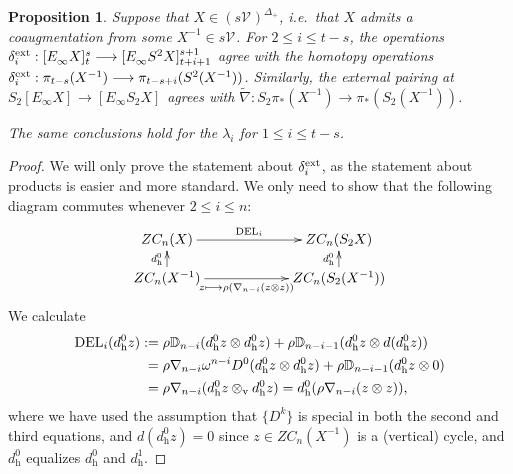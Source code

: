 \documentclass[11pt]{amsart} \renewcommand{\baselinestretch}{1.2}
\theoremstyle{plain}
\newtheorem{prop}[thm]{Proposition}
\numberwithin{equation}{section} %
\theoremstyle{plain}
\newtheorem{prop}[thm]{Proposition}
\numberwithin{equation}{chapter} %
\renewcommand{\to}{\longrightarrow}
\newcommand{\calV}{\mathcal{V}}
\newcommand{\vect}[2]{\calV^{#1}_{#2}}
\newcommand{\twist}{\omega}
\newcommand{\E}[5]{[E^{#1}_{#2}#3]^{#4}_{#5}}
\newcommand{\dver}{_\mathrm{v}}
\newcommand{\dhor}{_\mathrm{h}}
\renewcommand{\mapsto}{\longmapsto}
\begin{document}
\begin{second quadrant homotopy sseq operations}
\begin{prop}
\label{Prop on einfty ops}
Suppose that $X\in (s\vect{}{})^{\Delta_+}$, i.e.\ that $X$ admits a coaugmentation from some $X^{-1}\in s\vect{}{}$. For $2\leq i\leq t-s$, the operations $\delta^\textup{ext}_i:\E{}{\infty}{X}{s}{t}\to \E{}{\infty}{S^2X}{s+1}{t+i+1}$ agree with the homotopy operations $\delta^\textup{ext}_i:\pi_{t-s}(X^{-1})\to \pi_{t-s+i}(S^2(X^{-1}))$. Similarly, the external pairing at $S_2\E{}{\infty}{X}{}{}\to \E{}{\infty}{S_2X}{}{}$ agrees with  $\widetilde{\nabla}:S_2\pi_*(X^{-1})\to \pi_*(S_2(X^{-1}))$.

The same conclusions hold for the $\lambda_i$ for $1\leq i\leq t-s$.
\end{prop}
\begin{proof}
We will only prove the statement about $\delta_i^\textup{ext}$, as the statement about products is easier and more standard. We only need to show that the following diagram commutes whenever $2\leq i\leq n$:
\[\xymatrix@R=4mm@C=21mm{
ZC_{n}(X)
\ar[r]^-{\textup{DEL}_i}
\ar[d];[]^-{d\dhor^0}
&%
ZC_{n}(S_2X)\ar[d];[]^-{d\dhor^0}
\\%
ZC_{n}(X^{-1})
\ar[r]_-{z\mapsto \rho(\nabla_{n-i}(z\otimes z))}
&%
ZC_{n}(S_2(X^{-1}))
}\]
We calculate
\begin{alignat*}{3}
\textup{DEL}_i(d\dhor^{0}z)
:={}&
\rho\mathbb{D}_{n-i}(d\dhor^{0}z\otimes d\dhor^{0}z)+\rho\mathbb{D}_{n-i-1}(d\dhor^{0}z\otimes d(d\dhor^{0}z))%
\\
={}&
\rho\nabla_{n-i}\twist^{n-i}D^0(d\dhor^{0}z\otimes d\dhor^{0}z)+\rho\mathbb{D}_{n-i-1}(d\dhor^{0}z\otimes 0)\\
={}&
\rho\nabla_{n-i}(d\dhor^{0}z\otimes\dver d\dhor^{0}z)=d\dhor^{0}(\rho\nabla_{n-i}(z\otimes z)),
\end{alignat*}
where we have used the assumption that $\{D^k\}$ is special in both the second and third equations, and $d(d\dhor^{0}z)=0$ since $z\in ZC_n(X^{-1})$ is a (vertical) cycle, and $d\dhor^{0}$ equalizes $d\dhor^{0}$ and $d\dhor^{1}$.
\end{proof}



\end{second quadrant homotopy sseq operations}
\end{document}
